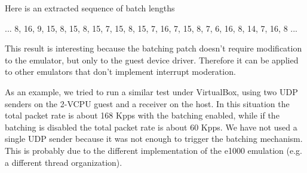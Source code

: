 Here is an extracted sequence of batch lengths

\begin{center}
... 8, 16, 9, 15, 8, 15, 8, 15, 7, 15, 8, 15, 7, 16, 7, 15, 8, 7, 6, 16, 8, 14, 7, 16, 8 ...
\end{center}

\vspace{0.5cm}

This result is interesting because the batching patch doesn't require modification to the emulator, but only to the guest device driver.
Therefore it can be applied to other emulators that don't implement interrupt moderation.

As an example, we tried to run a similar test under VirtualBox, using two UDP senders on the 2-VCPU
guest and a receiver on the host. In this situation the total packet rate is about 168 Kpps with the batching enabled, while if
the batching is disabled the total packet rate is about 60 Kpps. We have not used a single UDP sender because it was not enough to trigger
the batching mechanism. This is probably due to the different implementation of the e1000 emulation (e.g. a different thread organization).

